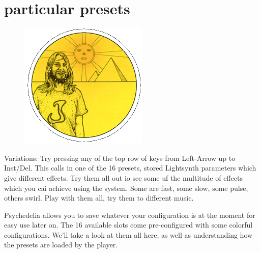 \chapter{particular presets} 
\label{sec:presets}
\lstset{style=6502Style}
\lstset{ 
   aboveskip=5pt,
   belowskip=0pt,
}

\begin{definition}
\setlength{\intextsep}{0pt}%
\setlength{\columnsep}{3pt}%
\begin{figure}
\includegraphics[width=\linewidth]{src/callout/psych.png} 
\end{figure}
\small
Variations: Try pressing any of the top row of keys from Left-Arrow
up to Inst/Del. This calls in one of the 16 presets, stored
Lightsynth parameters which give different effects. Try them all
out io see some uf the multitude of effects which you cai achieve
using the system. Some are fast, some slow, some pulse, others
swirl. Play with them all, try them to different music.

\end{definition}

Psychedelia allows you to save whatever your configuration is at the moment for easy use later on.
The 16 available slots come pre-configured with some colorful configurations. We'll take a look at them
all here, as well as understanding how the presets are loaded by the player.

